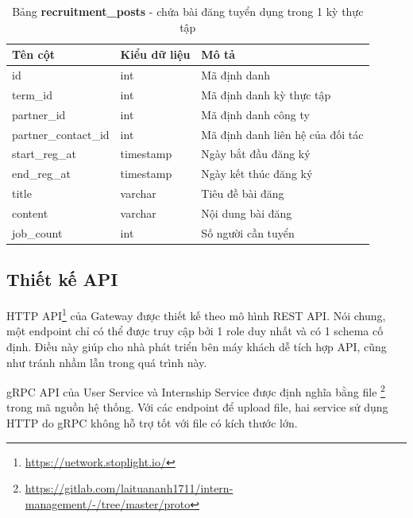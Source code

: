 \documentclass[./../main.tex]{subfiles}
\begin{document}
\begin{table}[H]
	\caption[Bảng recruitment\_posts]{Bảng \textbf{recruitment\_posts} - chứa bài đăng tuyển dụng trong 1 kỳ thực tập}
	\label{tab:db_posts}
	\begin{tabular}{|l|l|l|}
		\hline
		\textbf{Tên cột}     & \textbf{Kiểu dữ liệu} & \textbf{Mô tả}                   \\ \hline
		id                   & int                   & Mã định danh                     \\ \hline
		term\_id             & int                   & Mã định danh kỳ thực tập         \\ \hline
		partner\_id          & int                   & Mã định danh công ty             \\ \hline
		partner\_contact\_id & int                   & Mã định danh liên hệ của đối tác \\ \hline
		start\_reg\_at       & timestamp             & Ngày bắt đầu đăng ký             \\ \hline
		end\_reg\_at         & timestamp             & Ngày kết thúc đăng ký            \\ \hline
		title                & varchar               & Tiêu đề bài đăng                 \\ \hline
		content              & varchar               & Nội dung bài đăng                \\ \hline
		job\_count           & int                   & Số người cần tuyển               \\ \hline
	\end{tabular}
\end{table}

\subsection{Thiết kế API}

HTTP API\footnote{\url{https://uetwork.stoplight.io/}} của Gateway được thiết kế theo mô hình REST API. Nói chung, một endpoint chỉ có thể được truy cập bởi 1 role duy nhất và có 1 schema cố định. Điều này giúp cho nhà phát triển bên máy khách dễ tích hợp API, cũng như tránh nhầm lẫn trong quá trình này.

gRPC API của User Service và Internship Service được định nghĩa bằng file \footnote{\url{https://gitlab.com/laituananh1711/intern-management/-/tree/master/proto}} trong mã nguồn hệ thống. Với các endpoint để upload file, hai service sử dụng HTTP do gRPC không hỗ trợ tốt với file có kích thước lớn.
\end{document}

